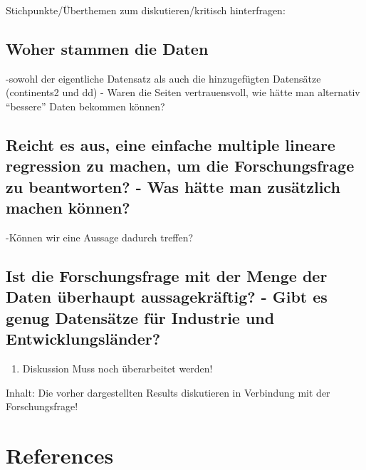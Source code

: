 \documentclass[
  11pt,
  a4paper,
  twoside]{scrbook}
\providecommand{\tightlist}{%
  \setlength{\itemsep}{0pt}\setlength{\parskip}{0pt}}
\begin{document}
Stichpunkte/Überthemen zum diskutieren/kritisch hinterfragen:

\hypertarget{woher-stammen-die-daten}{%
\section{Woher stammen die Daten}\label{woher-stammen-die-daten}}

-sowohl der eigentliche Datensatz als auch die hinzugefügten Datensätze (continents2 und dd) - Waren die Seiten vertrauensvoll, wie hätte man alternativ ``bessere'' Daten bekommen können?

\hypertarget{reicht-es-aus-eine-einfache-multiple-lineare-regression-zu-machen-um-die-forschungsfrage-zu-beantworten---was-huxe4tte-man-zusuxe4tzlich-machen-kuxf6nnen}{%
\section{Reicht es aus, eine einfache multiple lineare regression zu machen, um die Forschungsfrage zu beantworten? - Was hätte man zusätzlich machen können?}\label{reicht-es-aus-eine-einfache-multiple-lineare-regression-zu-machen-um-die-forschungsfrage-zu-beantworten---was-huxe4tte-man-zusuxe4tzlich-machen-kuxf6nnen}}

-Können wir eine Aussage dadurch treffen?

\hypertarget{ist-die-forschungsfrage-mit-der-menge-der-daten-uxfcberhaupt-aussagekruxe4ftig---gibt-es-genug-datensuxe4tze-fuxfcr-industrie-und-entwicklungsluxe4nder}{%
\section{Ist die Forschungsfrage mit der Menge der Daten überhaupt aussagekräftig? - Gibt es genug Datensätze für Industrie und Entwicklungsländer?}\label{ist-die-forschungsfrage-mit-der-menge-der-daten-uxfcberhaupt-aussagekruxe4ftig---gibt-es-genug-datensuxe4tze-fuxfcr-industrie-und-entwicklungsluxe4nder}}

\begin{enumerate}
\def\labelenumi{\arabic{enumi}.}
\setcounter{enumi}{4}
\tightlist
\item
  Diskussion
  Muss noch überarbeitet werden!
\end{enumerate}

Inhalt:
Die vorher dargestellten Results diskutieren in Verbindung mit der Forschungsfrage!

\pagebreak

\hypertarget{references}{%
\chapter*{References}\label{references}}
\end{document}
